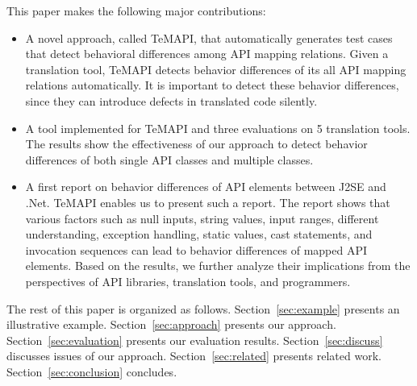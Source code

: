 This paper makes the following major contributions:

\begin{itemize}\vspace*{-1.5ex}
\item A novel approach, called TeMAPI, that automatically generates test cases that detect behavioral differences among API mapping relations. Given a translation tool, TeMAPI detects behavior differences of its all API mapping relations automatically. It is important to detect these behavior differences, since they can introduce defects in translated code silently.\vspace*{-1.5ex}
\item A tool implemented for TeMAPI and three evaluations on 5 translation tools. The results show the effectiveness of our approach to detect behavior differences of both single API classes and multiple classes.\vspace*{-1.5ex}
\item A first report on behavior differences of API elements between J2SE and .Net. TeMAPI enables us to present such a report. The report shows that various factors such as null inputs, string values, input ranges, different understanding, exception handling, static values, cast statements, and invocation sequences can lead to behavior differences of mapped API elements. Based on the results, we further analyze their implications from the perspectives of API libraries, translation tools, and programmers.
\end{itemize}\vspace*{-1.5ex}

The rest of this paper is organized as follows.
Section~\ref{sec:example} presents an illustrative example.
Section~\ref{sec:approach} presents our approach.
Section~\ref{sec:evaluation} presents our evaluation results.
Section~\ref{sec:discuss} discusses issues of our approach.
Section~\ref{sec:related} presents related work.
Section~\ref{sec:conclusion} concludes.



